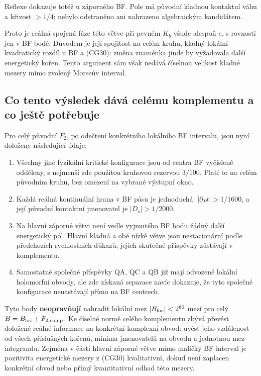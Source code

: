 \documentclass[11pt,a4paper]{article}
\theoremstyle{remark}\newtheorem{remark}[theorem]{Poznámka}
\numberwithin{equation}{section}
\providecommand{\tightlist}{\setlength{\itemsep}{0pt}\setlength{\parskip}{0pt}}
\begin{document}
Reflexe dokazuje totéž u záporného BF. Pole má původní kladnou kontaktní
váhu a křivost \(>1/4\); nebylo odstraněno ani nahrazeno algebraickým
kandidátem.

Proto je reálná spojená fáze této větve při pevném \(K_b\) všude alespoň
\(e\), s rovností jen v BF bodě. Důvodem je její spojitost na celém
kruhu, kladný lokální kvadratický rozdíl u BF a (CG30): změna znaménka
jinde by vyžadovala další energetický kořen. Tento argument sám však
nedává číselnou velikost kladné mezery mimo zvolený Morseův interval.

\hypertarget{co-tento-vuxfdsledek-duxe1vuxe1-celuxe9mu-komplementu-a-co-jeux161tux11b-potux159ebuje}{%
\subsection{Co tento výsledek dává celému komplementu a co ještě
potřebuje}\label{co-tento-vuxfdsledek-duxe1vuxe1-celuxe9mu-komplementu-a-co-jeux161tux11b-potux159ebuje}}

Pro celý původní \(F_2\), po odečtení konkrétního lokálního BF
intervalu, jsou nyní doloženy následující údaje:

\begin{enumerate}
\def\labelenumi{\arabic{enumi}.}
\tightlist
\item
  Všechny jiné fyzikální kritické konfigurace jsou od centra BF
  vyčísleně odděleny, s nejmenší zde použitou kruhovou rezervou
  \(3/100\). Platí to na celém původním kruhu, bez omezení na vybrané
  výstupní okno.
\item
  Každá reálná kontinuální hrana v BF pásu je jednoduchá:
  \(|\partial_Pt|>1/1600\), a její původní kontaktní jmenovatel je
  \(|D_o|>1/2000\).
\item
  Na hlavní záporné větvi není vedle vyjmutého BF bodu žádný další
  energetický pól. Hlavní kladná a obě nízké větve jsou nestacionární
  podle předchozích rychlostních důkazů; jejich skutečné příspěvky
  zůstávají v komplementu.
\item
  Samostatné společné příspěvky QA, QC a QB již mají odvozené lokální
  holomorfní obvody, ale zde získaná separace navíc dokazuje, že tyto
  společné konfigurace nenastávají přímo na BF centrech.
\end{enumerate}

Tyto body \textbf{neopravňují} nahradit lokální mez
\(|B_{\rm loc}|<2^{80}\) mezí pro celý \(B=B_{\rm loc}+F_{2,\rm comp}\).
Ke číselné normě celého komplementu zbývá převést doložené reálné
informace na konkrétní komplexní obvod: uvést jeho vzdálenost od všech
příslušných kořenů, minima jmenovatelů na obvodu a jednotnou mez
integrandu. Zejména v části hlavní záporné větve mimo maličký BF
interval je pozitivita energetické mezery z (CG30) kvalitativní, dokud
není zaplacen konkrétní obvod nebo přímý kvantitativní odhad této
mezery.
\end{document}
